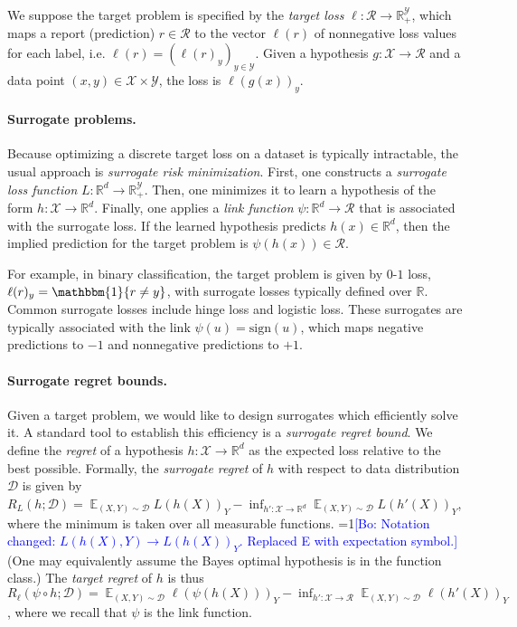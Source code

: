 \documentclass{article}
\newcommand{\Comments}{1}
\newcommand{\mynote}[2]{\ifnum\Comments=1\textcolor{#1}{#2}\fi}
\newcommand{\bo}[1]{\mynote{blue}{[Bo: #1]}}
\newcommand{\reals}{\mathbb{R}}
\newcommand{\D}{\mathcal{D}}
\DeclareMathOperator{\E}{\mathbb{E}}  %
\newcommand{\R}{\mathcal{R}}
\newcommand{\X}{\mathcal{X}}
\newcommand{\Y}{\mathcal{Y}}
\newcommand{\ones}{\mathbbm{1}}
\begin{document}
We suppose the target problem is specified by the \emph{target loss} $\ell:\R\to\reals^\Y_+$, which maps a report (prediction) $r \in \R$ to the vector $\ell(r)$ of nonnegative loss values for each label, i.e. $\ell(r) = (\ell(r)_y)_{y\in\Y}$.
Given a hypothesis $g: \X \to \R$ and a data point $(x,y) \in \X \times \Y$, the loss is $\ell(g(x))_y$.

\paragraph{Surrogate problems.}
Because optimizing a discrete target loss on a dataset is typically intractable, the usual approach is \emph{surrogate risk minimization}.
First, one constructs a \emph{surrogate loss function} $L:\reals^d\to\reals^\Y_+$.
Then, one minimizes it to learn a hypothesis of the form $h: \X \to \reals^d$.
Finally, one applies a \emph{link function} $\psi: \reals^d \to \R$ that is associated with the surrogate loss.
If the learned hypothesis predicts $h(x) \in \reals^d$, then the implied prediction for the target problem is $\psi(h(x)) \in \R$.

For example, in binary classification, the target problem is given by $0$-$1$ loss, $\ell(r)_y = \ones\{r\neq y\}$, with surrogate losses typically defined over $\reals$.
Common surrogate losses include hinge loss and logistic loss.
These surrogates are typically associated with the link $\psi(u) = \mathrm{sign}(u)$, which maps negative predictions to $-1$ and nonnegative predictions to $+1$.

\paragraph{Surrogate regret bounds.}
Given a target problem, we would like to design surrogates which efficiently solve it.
A standard tool to establish this efficiency is a \emph{surrogate regret bound}.
We define the \emph{regret} of a hypothesis $h: \X \to \reals^d$ as the expected loss relative to the best possible.
Formally, the \emph{surrogate regret} of $h$ with respect to data distribution $\D$ is given by $R_L(h;\D) = \E_{(X,Y)\sim\D} L(h(X))_Y - \inf_{h':\X\to\reals^d} \E_{(X,Y)\sim\D} L(h'(X))_Y$, where the minimum is taken over all measurable functions.
\bo{Notation changed: $L(h(X),Y) \to L(h(X))_Y$. Replaced E with expectation symbol.}
(One may equivalently assume the Bayes optimal hypothesis is in the function class.)
The \emph{target regret} of $h$ is thus $R_\ell(\psi\circ h;\D) = \E_{(X,Y)\sim\D} \ell(\psi(h(X)))_Y - \inf_{h':\X\to\R} \E_{(X,Y)\sim\D} \ell(h'(X))_Y$, where we recall that $\psi$ is the link function.
\end{document}
